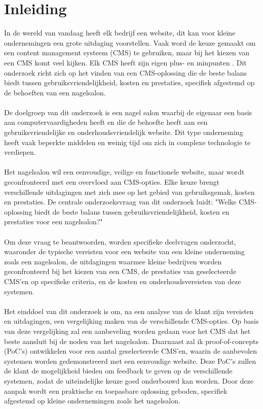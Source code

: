 
\section{Inleiding}%
\label{sec:inleiding}
\noindent
In de wereld van vandaag heeft elk bedrijf een website, dit kan voor kleine ondernemingen een grote uitdaging voorstellen. Vaak word de keuze gemaakt om een content management systeem (CMS) te gebruiken, maar bij het kiezen van een CMS komt veel kijken. Elk CMS heeft zijn eigen plus- en minpunten \autocite{Khalil2024}. Dit onderzoek richt zich op het vinden van een CMS-oplossing die de beste balans biedt tussen gebruiksvriendelijkheid, kosten en prestaties, specifiek afgestemd op de behoeften van een nagelsalon.
\\ \\
De doelgroep van dit onderzoek is een nagel salon waarbij de eigenaar een basis aan computervaardigheden heeft \autocite{Mesanovic2024} en die de behoefte heeft aan een gebruiksvriendelijke en onderhoudsvriendelijk website. Dit type onderneming heeft vaak beperkte middelen en weinig tijd om zich in complexe technologie te verdiepen.
\\ \\
Het nagelsalon wil een eenvoudige, veilige en functionele website, maar wordt geconfronteerd met een overvloed aan CMS-opties. Elke keuze brengt verschillende uitdagingen met zich mee op het gebied van gebruiksgemak, kosten en prestaties. De centrale onderzoeksvraag van dit onderzoek luidt: "Welke CMS-oplossing biedt de beste balans tussen gebruiksvriendelijkheid, kosten en prestaties voor een nagelsalon?"
\\ \\
Om deze vraag te beantwoorden, worden specifieke deelvragen onderzocht, waaronder de typische vereisten voor een website van een kleine onderneming zoals een nagelsalon, de uitdagingen waarmee kleine bedrijven worden geconfronteerd bij het kiezen van een CMS, de prestaties van geselecteerde CMS’en op specifieke criteria, en de kosten en onderhoudsvereisten van deze systemen.
\\ \\
Het einddoel van dit onderzoek is om, na een analyse van de klant zijn vereisten en uitdagingen, een vergelijking maken van de verschillende CMS-opties. Op basis van deze vergelijking zal een aanbeveling worden gedaan voor het CMS dat het beste aansluit bij de noden van het nagelsalon. Daarnaast zal ik proof-of-concepts (PoC's) ontwikkelen voor een aantal geselecteerde CMS'en, waarin de aanbevolen systemen worden gedemonstreerd met een eenvoudige website. Deze PoC's zullen de klant de mogelijkheid bieden om feedback te geven op de verschillende systemen, zodat de uiteindelijke keuze goed onderbouwd kan worden. Door deze aanpak wordt een praktische en toepasbare oplossing geboden, specifiek afgestemd op kleine ondernemingen zoals het nagelsalon.


